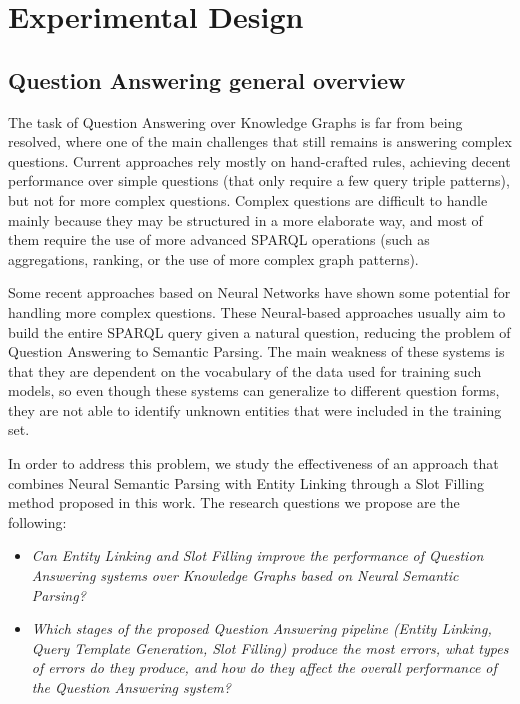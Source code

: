 \chapter{Experimental Design}
\label{cap4:experimentalDesign}

\section{Question Answering general overview}
\label{cap4:experimentalDesign/QaOverview}
The task of Question Answering over Knowledge Graphs is far from being resolved, where one of 
the main challenges that still remains is answering complex questions. Current approaches rely 
mostly on hand-crafted rules, achieving decent performance over simple questions (that only 
require a few query triple patterns), but not for more complex questions. Complex questions are 
difficult to handle mainly because they may be structured in a more elaborate way, and most of 
them require the use of more advanced SPARQL operations (such as aggregations, ranking, or the 
use of more complex graph patterns).

Some recent approaches based on Neural Networks have shown some potential for handling more 
complex questions. These Neural-based approaches usually aim to build the entire SPARQL query 
given a natural question, reducing the problem of Question Answering to Semantic Parsing. The 
main weakness of these systems is that they are dependent on the vocabulary of the data used 
for training such models, so even though these systems can generalize to different question 
forms, they are not able to identify unknown entities that were included in the training set.

In order to address this problem, we study the effectiveness of an approach that combines Neural 
Semantic Parsing with Entity Linking through a Slot Filling method proposed in this work. The 
research questions we propose are the following:

\begin{itemize}
    \item \textit{Can Entity Linking and Slot Filling improve the performance of Question 
    Answering systems over Knowledge Graphs based on Neural Semantic Parsing?}
    \item \textit{Which stages of the proposed Question Answering pipeline (Entity Linking, 
    Query Template Generation, Slot Filling) produce the most errors, what types of errors do 
    they produce, and how do they affect the overall performance of the Question Answering system?}
\end{itemize}

